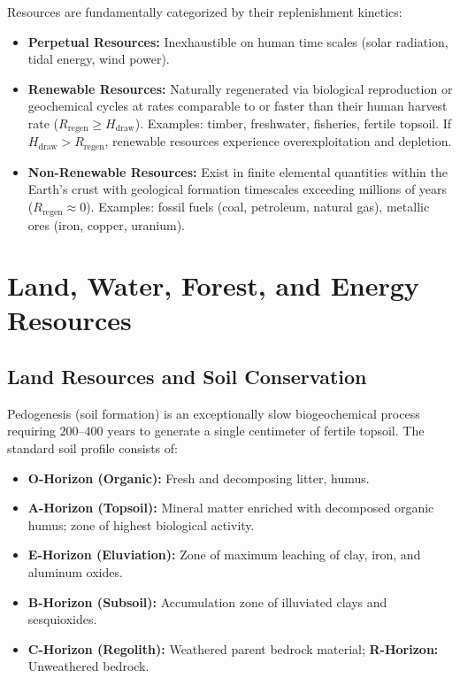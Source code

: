 Resources are fundamentally categorized by their replenishment kinetics:
\begin{itemize}[leftmargin=1.5em]
    \item \textbf{Perpetual Resources:} Inexhaustible on human time scales (solar radiation, tidal energy, wind power).
    \item \textbf{Renewable Resources:} Naturally regenerated via biological reproduction or geochemical cycles at rates comparable to or faster than their human harvest rate ($R_{\text{regen}} \ge H_{\text{draw}}$). Examples: timber, freshwater, fisheries, fertile topsoil. If $H_{\text{draw}} > R_{\text{regen}}$, renewable resources experience overexploitation and depletion.
    \item \textbf{Non-Renewable Resources:} Exist in finite elemental quantities within the Earth's crust with geological formation timescales exceeding millions of years ($R_{\text{regen}} \approx 0$). Examples: fossil fuels (coal, petroleum, natural gas), metallic ores (iron, copper, uranium).
\end{itemize}

\section{Land, Water, Forest, and Energy Resources}
\subsection{Land Resources and Soil Conservation}
Pedogenesis (soil formation) is an exceptionally slow biogeochemical process requiring $200\text{--}400\text{ years}$ to generate a single centimeter of fertile topsoil. The standard soil profile consists of:
\begin{itemize}[leftmargin=1.2em]
    \item \textbf{O-Horizon (Organic):} Fresh and decomposing litter, humus.
    \item \textbf{A-Horizon (Topsoil):} Mineral matter enriched with decomposed organic humus; zone of highest biological activity.
    \item \textbf{E-Horizon (Eluviation):} Zone of maximum leaching of clay, iron, and aluminum oxides.
    \item \textbf{B-Horizon (Subsoil):} Accumulation zone of illuviated clays and sesquioxides.
    \item \textbf{C-Horizon (Regolith):} Weathered parent bedrock material; \textbf{R-Horizon:} Unweathered bedrock.
\end{itemize}

